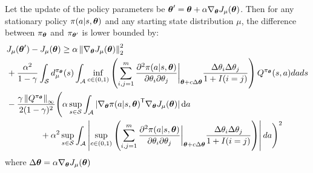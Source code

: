 \newcommand*{\secorder}{\left( \sum_{i,j=1}^{m} \frac{\partial^2\pol}{\partial\theta_i\partial\theta_j}\bigg|_{\vtheta + c\Delta\vtheta} \frac{\Delta\theta_i\Delta\theta_j}{1+I(i=j)} \right)}
\begin{theorem}
\label{th:pirotta-bound3}
Let the update of the policy parameters be ${\boldsymbol{\theta}}'={\boldsymbol{\theta}}+\alpha\nabla_{{\boldsymbol{\theta}}}J_\mu ({\boldsymbol{\theta}})$. Then for any stationary policy $\pi(a|s, {\boldsymbol{\theta}} )$ and any starting state distribution $\mu$, the difference between $\pi_{{\boldsymbol{\theta}}}$ and $\pi_{{\boldsymbol{\theta}}'}$ is lower bounded by:
\begin{align*}
&J_\mu(\vtheta') - J_\mu(\vtheta) \geq \alpha\norm[2]{\gradj}^2 \\
&+ \frac{\alpha^2}{1-\gamma}\int_{\sspace} d_\mu^{\pi_{\vtheta}}(s) \int_{\aspace} \inf_{c\in (0,1)} \secorder Q^{\pi_{\vtheta}}(s,a)dads
\\&-
\frac{\gamma\norm[\infty]{Q^{\pi_{\vtheta}}}}{2(1-\gamma)^2}\Bigg( \alpha \sup_{s\in\sspace}\int_{\aspace} |\nabla_{\vtheta}\transpose{\pol}\gradj | \de a
\\&\qquad\qquad + \alpha^2 \sup_{s\in\sspace}\int_{\aspace} \left| \sup_{c \in (0,1)} {\secorder} \right| da \Bigg)^2
\end{align*}
where $\Delta{\boldsymbol{\theta}}=\alpha\nabla_{{\boldsymbol{\theta}}}J_\mu({\boldsymbol{\theta}})$
\end{theorem}

